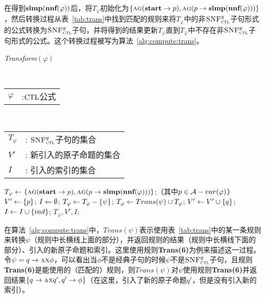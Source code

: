 在得到$\textbf{simp}(\textbf{nnf}(\varphi))$后，将$T_{\varphi}$初始化为$\{\textsc{a} \textsc{g}(\textbf{start} \rightarrow p), \textsc{a} \textsc{g}(p \rightarrow \textbf{simp}(\textbf{nnf}(\varphi)))\}$，然后转换过程从表~\ref{tab:trans}中找到匹配的规则来将$T_{\varphi}$中的非${\textsc{SNF}_{\textsc{ctl}}^g}$子句形式的公式转换为${\textsc{SNF}_{\textsc{ctl}}^g}$子句，并将得到的结果更新$T_{\varphi}$直到$T_{\varphi}$中不存在非${\textsc{SNF}_{\textsc{ctl}}^g}$子句形式的公式。这个转换过程被写为算法~\ref{alg:compute:trans}。


\begin{algorithm}[htbp]
	\small
	\caption{\emph{Transform}$(\varphi)$}
	\label{alg:compute:trans}
	\begin{algorithmic}[1]
		\REQUIRE ~~\\
		\begin{tabular}[t]{p{8mm}l}
			$\varphi$&:$\textrm{CTL}$公式
		\end{tabular}
		\ENSURE ~~\\
		\begin{tabular}[t]{p{8mm}l}
			$T_{\varphi}$&: ${\textsc{SNF}_{\textsc{ctl}}^g}$子句的集合\\
			$V'$& : 新引入的原子命题的集合\\
			$I$ &: 引入的索引的集合
		\end{tabular}
		\STATE $T_{\varphi}\leftarrow \{\textsc{a} \textsc{g}(\textbf{start} \rightarrow p), \textsc{a} \textsc{g}(p \rightarrow \textbf{simp}(\textbf{nnf}(\varphi)))\}$;（其中$p\in {\cal A}-var(\varphi)$）
		\STATE $V'\leftarrow \{p\}$;
		\STATE $I\leftarrow \emptyset$;
		\STATE $T_{\varphi} \leftarrow T_{\varphi}-\{\psi\}$;
		\STATE $T_{\varphi} \leftarrow Trans(\psi) \cup T_{\varphi}$;
		\STATE $V'\leftarrow V' \cup \{q\}$;
		\ENDIF
		\STATE $I\leftarrow I \cup \{ind\}$;
		\ENDIF
		\ENDWHILE
		\RETURN $T_{\varphi}, V', I$;
	\end{algorithmic}
\end{algorithm}


在算法~\ref{alg:compute:trans}中，$Trans(\psi)$表示使用表~\ref{tab:trans}中的某一条规则来转换$\psi$（规则中长横线上面的部分），并返回规则的结果（规则中长横线下面的部分）、引入的新原子命题和索引。这里使用规则\textbf{Trans(6)}为例来描述这一过程。令$\psi=q \rightarrow \textsc{a} \textsc{x} \phi$，可以看出当$\phi$不是经典子句的时候$\psi$不是${\textsc{SNF}_{\textsc{ctl}}^g}$子句，且规则\textbf{Trans(6)}是能使用的（匹配的）规则，则$Trans(\psi)$对$\psi$使用规则\textbf{Trans(6)}并返回结果$\{q \rightarrow \textsc{a} \textsc{x} q', q' \rightarrow \phi\}$（在这里，引入了新的原子命题$q'$，但是没有引入新的索引）。

